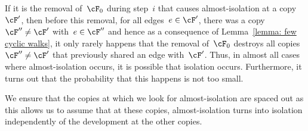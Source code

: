 \documentclass[11pt]{amsart}
\theoremstyle{definition}
\numberwithin{equation}{section}
\begin{document}
	If it is the removal of~$\cF_0$ during step~$i$ that causes almost-isolation at a copy~$\cF'$, then before this removal, for all edges~$e\in\cF'$, there was a copy~$\cF''\neq\cF'$ with~$e\in\cF''$ and hence as a consequence of Lemma~\ref{lemma: few cyclic walks}, it only rarely happens that the removal of~$\cF_0$ destroys all copies~$\cF''\neq\cF'$ that previously shared an edge with~$\cF'$.
	Thus, in almost all cases where almost-isolation occurs, it is possible that isolation occurs.
	Furthermore, it turns out that the probability that this happens is not too small.
	
	We ensure that the copies at which we look for almost-isolation are spaced out as this allows us to assume that at these copies, almost-isolation turns into isolation independently of the development at the other copies.
	
\end{document}
